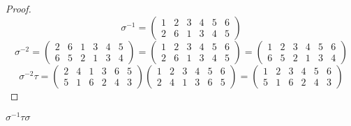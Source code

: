 \begin{proof}
    \[
        {\sigma}^{-1} =
        \begin{pmatrix}
            1 & 2 & 3 & 4 & 5 & 6 \\
            2 & 6 & 1 & 3 & 4 & 5
        \end{pmatrix}
    \]
    \[
        {\sigma}^{-2} =
        \begin{pmatrix}
            2 & 6 & 1 & 3 & 4 & 5 \\
            6 & 5 & 2 & 1 & 3 & 4
        \end{pmatrix} =
        \begin{pmatrix}
            1 & 2 & 3 & 4 & 5 & 6 \\
            2 & 6 & 1 & 3 & 4 & 5
        \end{pmatrix} =
        \begin{pmatrix}
            1 & 2 & 3 & 4 & 5 & 6 \\
            6 & 5 & 2 & 1 & 3 & 4
        \end{pmatrix}
    \]
    \[
        {\sigma}^{-2}\tau =
        \begin{pmatrix}
            2 & 4 & 1 & 3 & 6 & 5 \\
            5 & 1 & 6 & 2 & 4 & 3
        \end{pmatrix}
        \begin{pmatrix}
            1 & 2 & 3 & 4 & 5 & 6 \\
            2 & 4 & 1 & 3 & 6 & 5
        \end{pmatrix} =
        \begin{pmatrix}
            1 & 2 & 3 & 4 & 5 & 6 \\
            5 & 1 & 6 & 2 & 4 & 3
        \end{pmatrix}
    \]
\end{proof}

\newpage
\begin{exercise}
    ${\sigma}^{-1}\tau\sigma$
\end{exercise}


